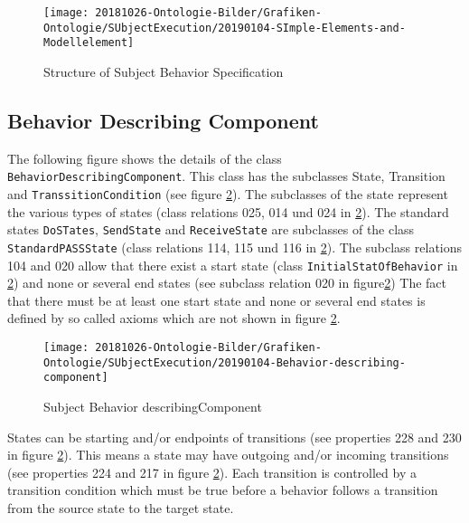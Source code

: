\begin{figure}[htbp]
	\centering
	\texttt{[image: 20181026-Ontologie-Bilder/Grafiken-Ontologie/SUbjectExecution/20190104-SImple-Elements-and-Modellelement]}
	\caption[Structure of Subject Behavior Specification]{Structure of Subject Behavior Specification}
	\label{fig:20190104-simple-elements-and-modellelement}
\end{figure}

\subsection{Behavior Describing Component}

The following figure shows the details of the class \texttt{BehaviorDescribingComponent}. This class has the subclasses State, Transition and \texttt{TranssitionCondition} (see figure \ref{fig:20190104-behavior-describing-component}). The subclasses of the state represent the various types of states (class relations 025, 014 und 024 in \ref{fig:20190104-behavior-describing-component}). The standard states \texttt{DoSTates}, \texttt{SendState} and \texttt{ReceiveState} are subclasses of the class \texttt{StandardPASSState} (class relations 114, 115 und 116 in \ref{fig:20190104-behavior-describing-component}). The subclass relations 104 and 020 allow that there exist a start state (class \texttt{InitialStatOfBehavior} in \ref{fig:20190104-behavior-describing-component}) and none or several end states (see subclass relation 020 in figure\ref{fig:20190104-behavior-describing-component}) The fact that there must be at least one start state and none or several end states is defined by so called axioms which are not shown in figure \ref{fig:20190104-behavior-describing-component}.

\begin{figure}[htbp]
	\centering
	\texttt{[image: 20181026-Ontologie-Bilder/Grafiken-Ontologie/SUbjectExecution/20190104-Behavior-describing-component]}
	\caption[Subject Behavior describingComponent]{Subject Behavior describingComponent}
	\label{fig:20190104-behavior-describing-component}
\end{figure}

States can be starting and/or endpoints of transitions (see properties 228 and 230 in figure \ref{fig:20190104-behavior-describing-component}). This means a state may have outgoing and/or incoming transitions (see properties 224 and 217 in figure \ref{fig:20190104-behavior-describing-component}). Each transition is controlled by a transition condition which must be true before a behavior follows a transition from the source state to the target state.


